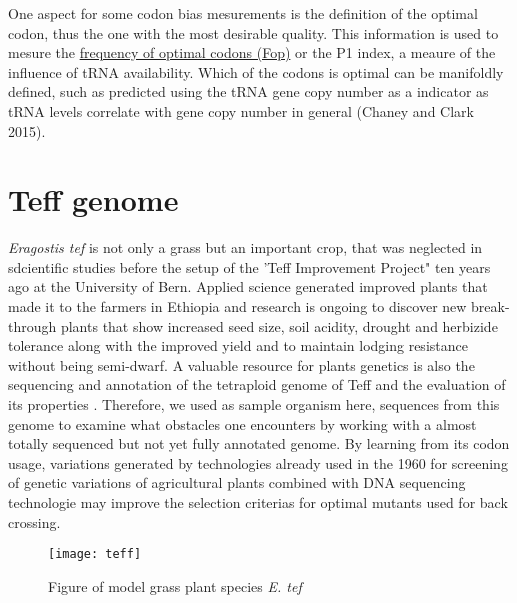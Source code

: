 One aspect for some codon bias mesurements is the definition of the optimal codon, thus the one with the most desirable quality. This information is used to mesure the \hyperlink{function:Fop}{frequency of optimal codons (Fop)} or the P1 index, a meaure of the influence of tRNA availability. Which of the codons is optimal can be manifoldly defined, such as predicted using the tRNA gene copy number as a indicator as tRNA levels correlate with gene copy number in general \cite{Chaney2015}(Chaney and Clark 2015).

\section{Teff genome}
\textit{Eragostis tef} is not only a grass but an important crop, that was neglected in sdcientific studies before the setup of the 'Teff Improvement Project" ten years ago at the University of Bern. Applied science generated improved plants that made it to the farmers in Ethiopia and research is ongoing to discover new break-through plants that show increased seed size, soil acidity, drought and herbizide tolerance along with the improved yield and to maintain lodging resistance without being semi-dwarf. A valuable resource for plants genetics is also the sequencing and annotation of the tetraploid genome of Teff and the evaluation of its properties \cite{cannarozzi2014genome}. Therefore, we used as sample organism here, sequences from this genome to examine what obstacles one encounters by working with a almost totally sequenced but not yet fully annotated genome. By learning from its codon usage, variations generated by technologies already used in the 1960 for screening of genetic variations of agricultural plants combined with DNA sequencing technologie may improve the selection criterias for optimal mutants used for back crossing. 

\begin{figure}[tb] 
\centering 
\texttt{[image: teff]} 
\caption[\textit{Eragostis tef} growing in culture room]{Figure of model grass plant species \textit{E. tef}}
\label{fig:teff} 
\end{figure}


